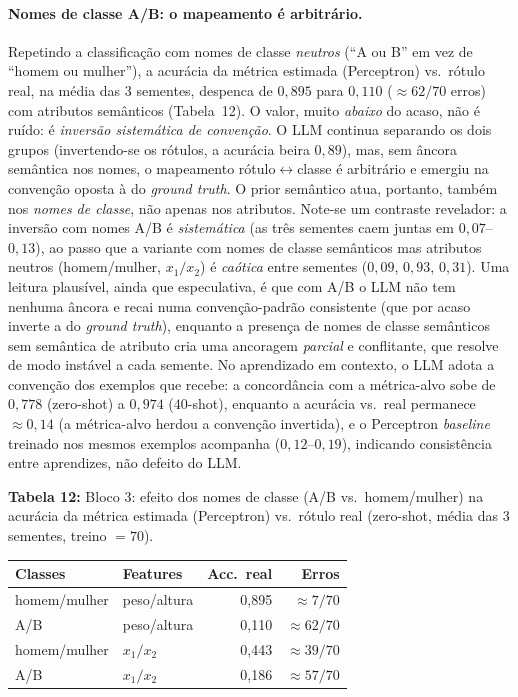 \documentclass[12pt,a4paper]{article}
\begin{document}
\paragraph{Nomes de classe A/B: o mapeamento é arbitrário.}
Repetindo a classificação com nomes de classe \emph{neutros} (``A ou B'' em vez de
``homem ou mulher''), a acurácia da métrica estimada (Perceptron) vs.\ rótulo real, na
média das $3$ sementes, despenca de $0{,}895$ para $0{,}110$ ($\approx 62/70$ erros) com
atributos semânticos (Tabela~12). O valor, muito \emph{abaixo} do
acaso, não é ruído: é \emph{inversão sistemática de convenção}. O LLM continua separando
os dois grupos (invertendo-se os rótulos, a acurácia beira $0{,}89$), mas, sem âncora
semântica nos nomes, o mapeamento rótulo$\leftrightarrow$classe é arbitrário e emergiu na
convenção oposta à do \emph{ground truth}. O prior semântico atua, portanto, também nos
\emph{nomes de classe}, não apenas nos atributos. Note-se um contraste revelador: a
inversão com nomes A/B é \emph{sistemática} (as três sementes caem juntas em $0{,}07$–$0{,}13$),
ao passo que a variante com nomes de classe semânticos mas atributos neutros
(homem/mulher, $x_1/x_2$) é \emph{caótica} entre sementes ($0{,}09$, $0{,}93$, $0{,}31$).
Uma leitura plausível, ainda que especulativa, é que com A/B o LLM não tem nenhuma âncora e
recai numa convenção-padrão consistente (que por acaso inverte a do \emph{ground truth}),
enquanto a presença de nomes de classe semânticos sem semântica de atributo cria uma
ancoragem \emph{parcial} e conflitante, que resolve de modo instável a cada semente. No
aprendizado em contexto,
o LLM adota a convenção dos
exemplos que recebe: a concordância com a métrica-alvo sobe de $0{,}778$ (zero-shot) a
$0{,}974$ ($40$-shot), enquanto a acurácia vs.\ real permanece $\approx 0{,}14$ (a
métrica-alvo herdou a convenção invertida), e o Perceptron \emph{baseline} treinado nos
mesmos exemplos acompanha ($0{,}12$–$0{,}19$), indicando consistência entre aprendizes, não
defeito do LLM.


\bigskip

\noindent \textbf{Tabela 12:} Bloco 3: efeito dos nomes de classe (A/B vs.\ homem/mulher) na acurácia da
métrica estimada (Perceptron) vs.\ rótulo real (zero-shot, média das $3$ sementes,
treino $=70$).

\begin{tabular}{llrr}
\toprule
\textbf{Classes} & \textbf{Features} & \textbf{Acc.\ real} & \textbf{Erros} \\
\midrule
homem/mulher & peso/altura & 0,895 & $\approx 7/70$ \\
A/B          & peso/altura & 0,110 & $\approx 62/70$ \\
homem/mulher & $x_1/x_2$   & 0,443 & $\approx 39/70$ \\
A/B          & $x_1/x_2$   & 0,186 & $\approx 57/70$ \\
\bottomrule
\end{tabular}
\end{document}
